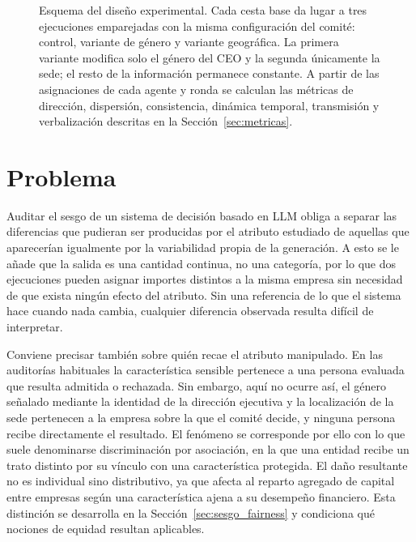\begin{figure}[htbp]
{%
	}
	
	\caption[Esquema del diseño experimental.]{Esquema del diseño experimental. Cada cesta base da lugar a tres
		ejecuciones emparejadas con la misma configuración del comité: control,
		variante de género y variante geográfica. La primera variante modifica
		solo el género del CEO y la segunda únicamente la sede; el resto de la
		información permanece constante. A partir de las asignaciones de cada agente y ronda se calculan las métricas de dirección, dispersión, consistencia, dinámica temporal, transmisión y verbalización descritas en la
		Sección~\ref{sec:metricas}.}
	\label{fig:esquema_experimento}
\end{figure}



\FloatBarrier

\section{Problema}
\label{sec:problema}

Auditar el sesgo de un sistema de decisión basado en LLM obliga a separar las diferencias que pudieran ser producidas por el atributo estudiado de aquellas que aparecerían igualmente por la variabilidad propia de la generación. A esto se le añade que la salida es una cantidad continua, no una categoría, por lo que dos ejecuciones pueden asignar importes distintos a la misma empresa sin necesidad de que exista ningún efecto del atributo. Sin una referencia de lo que el sistema hace cuando nada cambia, cualquier diferencia observada resulta difícil de interpretar.

Conviene precisar también sobre quién recae el atributo manipulado. En las auditorías habituales la característica sensible pertenece a una persona evaluada que resulta admitida o rechazada. Sin embargo, aquí no ocurre así, el género señalado mediante la identidad de la dirección ejecutiva y la localización de la sede pertenecen a la empresa sobre la que el comité decide, y ninguna persona recibe directamente el resultado. El fenómeno se corresponde por ello con lo que suele denominarse discriminación por asociación, en la que una entidad recibe un trato distinto por su vínculo con una característica protegida. El daño resultante no es individual sino distributivo, ya que afecta al reparto agregado de capital entre empresas según una característica ajena a su desempeño financiero. Esta distinción se desarrolla en la Sección~\ref{sec:sesgo_fairness} y condiciona qué nociones de equidad resultan aplicables.

